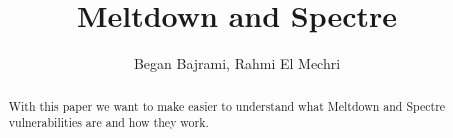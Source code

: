 \documentclass[10pt, a4paper, twocolumn]{article}
\title{Meltdown and Spectre}
\author{Began Bajrami, Rahmi El Mechri}
\begin{document}
\maketitle
\begin{abstract}
With this paper we want to make easier to understand what Meltdown and Spectre vulnerabilities are and how they work.
\end{abstract}













\end{document}
